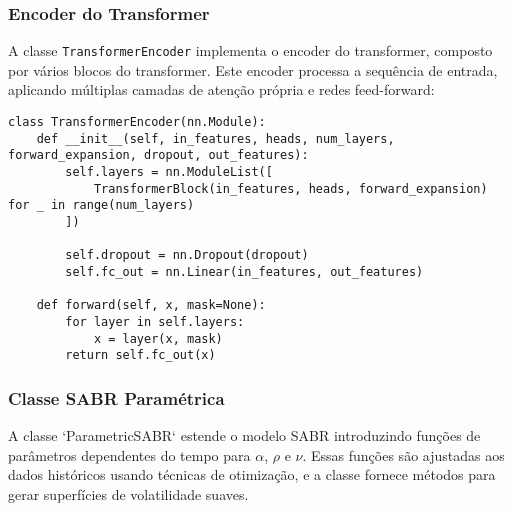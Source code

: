 \subsubsection{Encoder do Transformer}

A classe \texttt{TransformerEncoder} implementa o encoder do transformer, composto por vários blocos do transformer. Este encoder processa a sequência de entrada, aplicando múltiplas camadas de atenção própria e redes feed-forward:

\begin{verbatim}
class TransformerEncoder(nn.Module):
	def __init__(self, in_features, heads, num_layers, forward_expansion, dropout, out_features):
		self.layers = nn.ModuleList([
			TransformerBlock(in_features, heads, forward_expansion) for _ in range(num_layers)
		])
		
		self.dropout = nn.Dropout(dropout)
		self.fc_out = nn.Linear(in_features, out_features)
		
	def forward(self, x, mask=None):
		for layer in self.layers:
			x = layer(x, mask)
		return self.fc_out(x)
\end{verbatim}

\subsubsection{Classe SABR Paramétrica}

A classe `ParametricSABR` estende o modelo SABR introduzindo funções de parâmetros dependentes do tempo para \(\alpha\), \(\rho\) e \(\nu\). Essas funções são ajustadas aos dados históricos usando técnicas de otimização, e a classe fornece métodos para gerar superfícies de volatilidade suaves.


